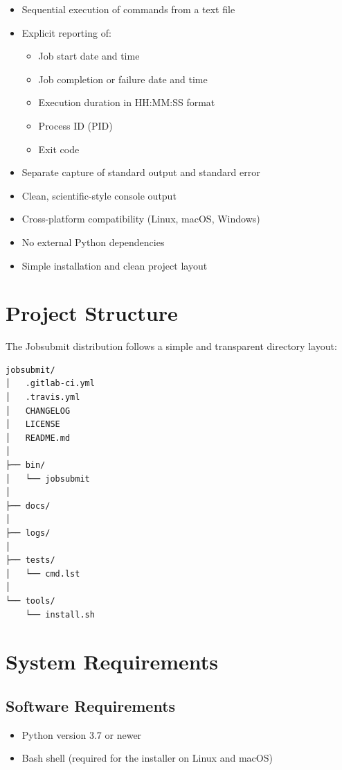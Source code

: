 \documentclass[12pt,a4paper]{article}
\begin{document}
\begin{itemize}
    \item Sequential execution of commands from a text file
    \item Explicit reporting of:
    \begin{itemize}
        \item Job start date and time
        \item Job completion or failure date and time
        \item Execution duration in HH:MM:SS format
        \item Process ID (PID)
        \item Exit code
    \end{itemize}
    \item Separate capture of standard output and standard error
    \item Clean, scientific-style console output
    \item Cross-platform compatibility (Linux, macOS, Windows)
    \item No external Python dependencies
    \item Simple installation and clean project layout
\end{itemize}

\section{Project Structure}

The Jobsubmit distribution follows a simple and transparent directory layout:

\begin{lstlisting}
jobsubmit/
│   .gitlab-ci.yml
│   .travis.yml
│   CHANGELOG
│   LICENSE
│   README.md
│
├── bin/
│   └── jobsubmit
│
├── docs/
│
├── logs/
│
├── tests/
│   └── cmd.lst
│
└── tools/
    └── install.sh
\end{lstlisting}

\section{System Requirements}

\subsection{Software Requirements}
\begin{itemize}
    \item Python version 3.7 or newer
    \item Bash shell (required for the installer on Linux and macOS)
\end{itemize}
\end{document}
